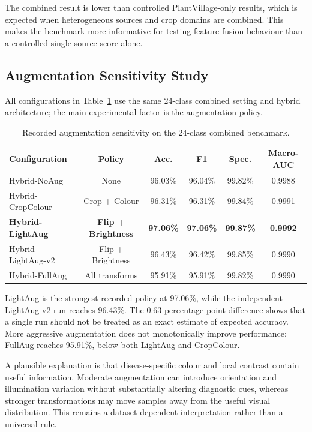 \documentclass[a4paper,fleqn]{cas-dc}
\begin{document}
The combined result is lower than controlled PlantVillage-only results, which is expected when heterogeneous sources and crop domains are combined. This makes the benchmark more informative for testing feature-fusion behaviour than a controlled single-source score alone.

\subsection{Augmentation Sensitivity Study}
\label{sec:augmentationresults}
All configurations in Table~\ref{tab:augstudy} use the same 24-class combined setting and hybrid architecture; the main experimental factor is the augmentation policy.

\begin{table}[!t]
\centering
\caption{Recorded augmentation sensitivity on the 24-class combined benchmark.}
\label{tab:augstudy}
\scriptsize
\begin{tabular}{lccccc}
\toprule
Configuration & Policy & Acc. & F1 & Spec. & Macro-AUC \\
\midrule
Hybrid-NoAug & None & 96.03\% & 96.04\% & 99.82\% & 0.9988 \\
Hybrid-CropColour & Crop + Colour & 96.31\% & 96.31\% & 99.84\% & 0.9991 \\
\textbf{Hybrid-LightAug} & \textbf{Flip + Brightness} & \textbf{97.06\%} & \textbf{97.06\%} & \textbf{99.87\%} & \textbf{0.9992} \\
Hybrid-LightAug-v2 & Flip + Brightness & 96.43\% & 96.42\% & 99.85\% & 0.9990 \\
Hybrid-FullAug & All transforms & 95.91\% & 95.91\% & 99.82\% & 0.9990 \\
\bottomrule
\end{tabular}
\end{table}

LightAug is the strongest recorded policy at 97.06\%, while the independent LightAug-v2 run reaches 96.43\%. The 0.63 percentage-point difference shows that a single run should not be treated as an exact estimate of expected accuracy. More aggressive augmentation does not monotonically improve performance: FullAug reaches 95.91\%, below both LightAug and CropColour.

A plausible explanation is that disease-specific colour and local contrast contain useful information. Moderate augmentation can introduce orientation and illumination variation without substantially altering diagnostic cues, whereas stronger transformations may move samples away from the useful visual distribution. This remains a dataset-dependent interpretation rather than a universal rule.
\end{document}
